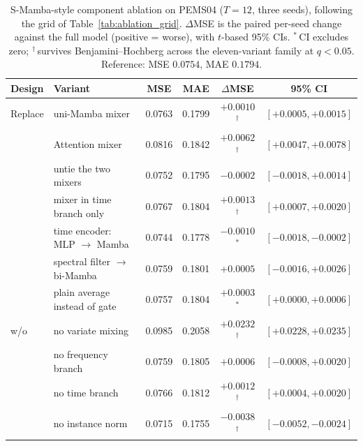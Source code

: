 \documentclass[review,12pt]{elsarticle}
\begin{document}
\begin{table}[tb]
\centering
\caption{S-Mamba-style component ablation on PEMS04 ($T{=}12$, three seeds),
following the grid of Table~\ref{tab:ablation_grid}. $\Delta$MSE is the paired
per-seed change against the full model (positive = worse), with $t$-based 95\%
CIs. $^{*}$\,CI excludes zero; $^{\dagger}$\,survives Benjamini--Hochberg across
the eleven-variant family at $q{<}0.05$. Reference: MSE $0.0754$, MAE $0.1794$.}
\label{tab:ablation_pems}
\scriptsize
\setlength{\tabcolsep}{4pt}
\begin{tabular}{@{}ll cc cc@{}}
\toprule
Design & Variant & MSE & MAE & $\Delta$MSE & 95\% CI \\
\midrule
Replace & uni-Mamba mixer & 0.0763 & 0.1799 & $+0.0010$$^{\dagger}$ & $[+0.0005,+0.0015]$ \\
 & Attention mixer & 0.0816 & 0.1842 & $+0.0062$$^{\dagger}$ & $[+0.0047,+0.0078]$ \\
 & untie the two mixers & 0.0752 & 0.1795 & $-0.0002$ & $[-0.0018,+0.0014]$ \\
 & mixer in time branch only & 0.0767 & 0.1804 & $+0.0013$$^{\dagger}$ & $[+0.0007,+0.0020]$ \\
 & time encoder: MLP $\to$ Mamba & 0.0744 & 0.1778 & $-0.0010$$^{*}$ & $[-0.0018,-0.0002]$ \\
 & spectral filter $\to$ bi-Mamba & 0.0759 & 0.1801 & $+0.0005$ & $[-0.0016,+0.0026]$ \\
 & plain average instead of gate & 0.0757 & 0.1804 & $+0.0003$$^{*}$ & $[+0.0000,+0.0006]$ \\
\midrule
w/o & no variate mixing & 0.0985 & 0.2058 & $+0.0232$$^{\dagger}$ & $[+0.0228,+0.0235]$ \\
 & no frequency branch & 0.0759 & 0.1805 & $+0.0006$ & $[-0.0008,+0.0020]$ \\
 & no time branch & 0.0766 & 0.1812 & $+0.0012$$^{\dagger}$ & $[+0.0004,+0.0020]$ \\
 & no instance norm & 0.0715 & 0.1755 & $-0.0038$$^{\dagger}$ & $[-0.0052,-0.0024]$ \\
\bottomrule
\end{tabular}
\end{table}
\end{document}

